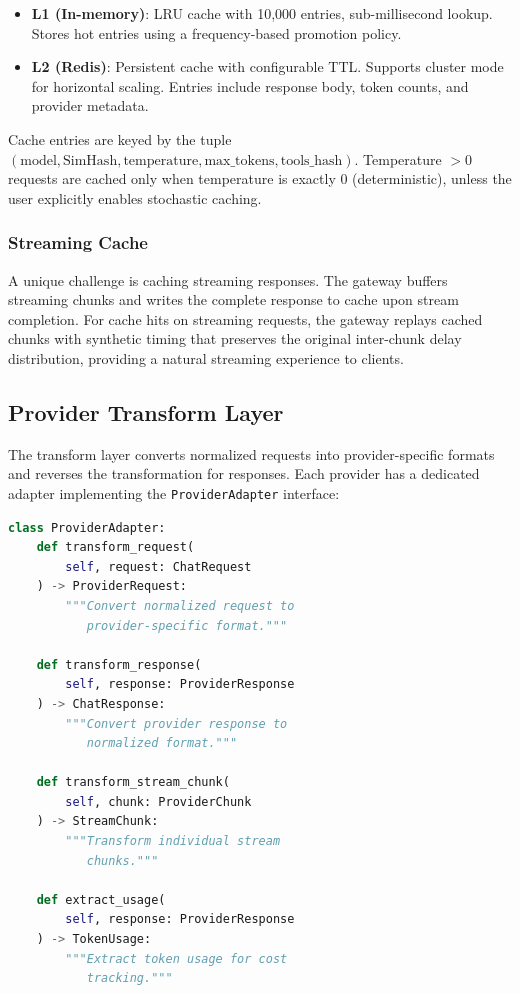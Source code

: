 \documentclass[11pt,twocolumn]{article}
\begin{document}
\begin{itemize}[leftmargin=*]
    \item \textbf{L1 (In-memory)}: LRU cache with 10,000 entries, sub-millisecond lookup. Stores hot entries using a frequency-based promotion policy.
    \item \textbf{L2 (Redis)}: Persistent cache with configurable TTL. Supports cluster mode for horizontal scaling. Entries include response body, token counts, and provider metadata.
\end{itemize}

Cache entries are keyed by the tuple $(\text{model}, \text{SimHash}, \text{temperature}, \text{max\_tokens}, \text{tools\_hash})$. Temperature $> 0$ requests are cached only when temperature is exactly 0 (deterministic), unless the user explicitly enables stochastic caching.

\subsubsection{Streaming Cache}

A unique challenge is caching streaming responses. The gateway buffers streaming chunks and writes the complete response to cache upon stream completion. For cache hits on streaming requests, the gateway replays cached chunks with synthetic timing that preserves the original inter-chunk delay distribution, providing a natural streaming experience to clients.

\subsection{Provider Transform Layer}

The transform layer converts normalized requests into provider-specific formats and reverses the transformation for responses. Each provider has a dedicated adapter implementing the \texttt{ProviderAdapter} interface:

\begin{lstlisting}[language=Python, caption=Provider adapter interface]
class ProviderAdapter:
    def transform_request(
        self, request: ChatRequest
    ) -> ProviderRequest:
        """Convert normalized request to
           provider-specific format."""

    def transform_response(
        self, response: ProviderResponse
    ) -> ChatResponse:
        """Convert provider response to
           normalized format."""

    def transform_stream_chunk(
        self, chunk: ProviderChunk
    ) -> StreamChunk:
        """Transform individual stream
           chunks."""

    def extract_usage(
        self, response: ProviderResponse
    ) -> TokenUsage:
        """Extract token usage for cost
           tracking."""
\end{lstlisting}
\end{document}
